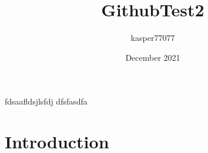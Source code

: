 \documentclass{article}
\title{GithubTest2}
\author{kasper77077 }
\date{December 2021}
\begin{document}
fdsaafldsjlsfdj 
dfsfasdfa
\maketitle

\section{Introduction}
\end{document}
